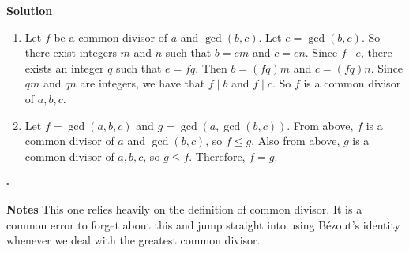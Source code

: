 \documentclass[11pt]{article}
\newcommand{\divides}{\mid}
\newenvironment{solution}{\par\noindent\textbf{Solution}\quad}{\hfill$\square$\par}
\newenvironment{notes}{\par\noindent\textbf{Notes}\quad}{\par}
\begin{document}
\begin{enumerate}[label=\arabic*.]
\begin{solution}
\begin{enumerate}[label=(\alph*)]
        \item Let $f$ be a common divisor of $a$ and $\gcd(b,c)$. Let $e=\gcd(b,c)$. So there exist integers $m$ and $n$ such that $b=em$ and $c=en$. Since $f\divides e$, there exists an integer $q$ such that $e=fq$. Then $b=(fq)m$ and $c=(fq)n$. Since $qm$ and $qn$ are integers, we have that $f\divides b$ and $f\divides c$. So $f$ is a common divisor of $a,b,c$.

        \item Let $f=\gcd(a,b,c)$ and $g=\gcd(a,\gcd(b,c))$. From above, $f$ is a common divisor of $a$ and $\gcd(b,c)$, so $f\leq g$. Also from above, $g$ is a common divisor of $a,b,c$, so $g\leq f$. Therefore, $f=g$.
    \end{enumerate}
    \end{solution}

    \begin{notes}
    This one relies heavily on the definition of common divisor. It is a common error to forget about this and jump straight into using B\'{e}zout's identity whenever we deal with the greatest common divisor.
    \end{notes}
\end{enumerate}
\end{document}
